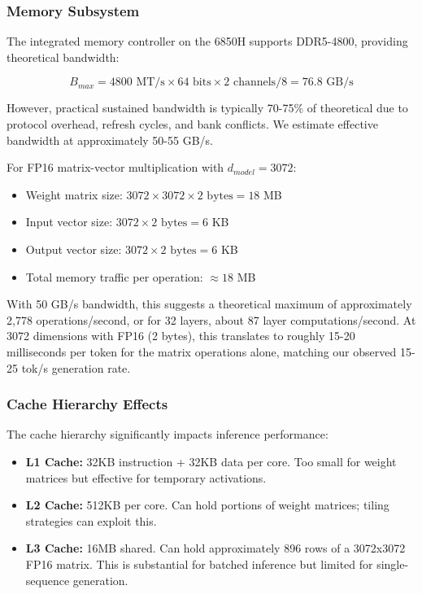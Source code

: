 \subsubsection{Memory Subsystem}

The integrated memory controller on the 6850H supports DDR5-4800, providing theoretical bandwidth:

\begin{equation}
B_{max} = 4800 \text{ MT/s} \times 64 \text{ bits} \times 2 \text{ channels} / 8 = 76.8 \text{ GB/s}
\end{equation}

However, practical sustained bandwidth is typically 70-75\% of theoretical due to protocol overhead, refresh cycles, and bank conflicts. We estimate effective bandwidth at approximately 50-55 GB/s.

For FP16 matrix-vector multiplication with $d_{model} = 3072$:

\begin{itemize}
    \item Weight matrix size: $3072 \times 3072 \times 2 \text{ bytes} = 18$ MB
    \item Input vector size: $3072 \times 2 \text{ bytes} = 6$ KB
    \item Output vector size: $3072 \times 2 \text{ bytes} = 6$ KB
    \item Total memory traffic per operation: $\approx 18$ MB
\end{itemize}

With 50 GB/s bandwidth, this suggests a theoretical maximum of approximately 2,778 operations/second, or for 32 layers, about 87 layer computations/second. At 3072 dimensions with FP16 (2 bytes), this translates to roughly 15-20 milliseconds per token for the matrix operations alone, matching our observed 15-25 tok/s generation rate.

\subsubsection{Cache Hierarchy Effects}

The cache hierarchy significantly impacts inference performance:

\begin{itemize}
    \item \textbf{L1 Cache:} 32KB instruction + 32KB data per core. Too small for weight matrices but effective for temporary activations.
    \item \textbf{L2 Cache:} 512KB per core. Can hold portions of weight matrices; tiling strategies can exploit this.
    \item \textbf{L3 Cache:} 16MB shared. Can hold approximately 896 rows of a 3072x3072 FP16 matrix. This is substantial for batched inference but limited for single-sequence generation.
\end{itemize}

